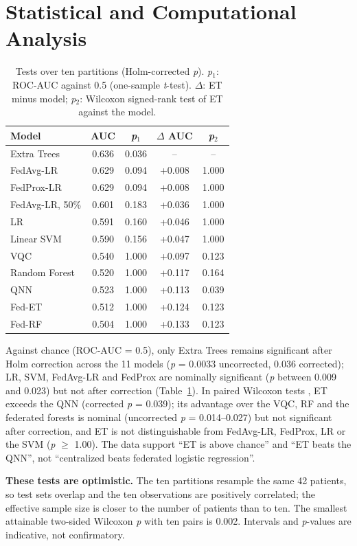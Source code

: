 \documentclass[conference,a4paper]{IEEEtran}
\begin{document}
\section{Statistical and Computational Analysis}
\begin{table}[!t]\centering\caption{Tests over ten partitions (Holm-corrected \textit{p}). \textit{p}$_1$: ROC-AUC against 0.5 (one-sample \textit{t}-test). $\Delta$: ET minus model; \textit{p}$_2$: Wilcoxon signed-rank test of ET against the model.}\label{tab:stats}\scriptsize\setlength{\tabcolsep}{2.5pt}
\begin{tabular}{lcccc}\toprule
Model & AUC & \textit{p}$_1$ & $\Delta$ AUC & \textit{p}$_2$\\\midrule
Extra Trees & 0.636 & 0.036 & -- & --\\
FedAvg-LR & 0.629 & 0.094 & +0.008 & 1.000\\
FedProx-LR & 0.629 & 0.094 & +0.008 & 1.000\\
FedAvg-LR, 50\% & 0.601 & 0.183 & +0.036 & 1.000\\
LR & 0.591 & 0.160 & +0.046 & 1.000\\
Linear SVM & 0.590 & 0.156 & +0.047 & 1.000\\
VQC & 0.540 & 1.000 & +0.097 & 0.123\\
Random Forest & 0.520 & 1.000 & +0.117 & 0.164\\
QNN & 0.523 & 1.000 & +0.113 & 0.039\\
Fed-ET & 0.512 & 1.000 & +0.124 & 0.123\\
Fed-RF & 0.504 & 1.000 & +0.133 & 0.123\\
\bottomrule\end{tabular}\end{table}
Against chance (ROC-AUC = 0.5), only Extra Trees remains significant after Holm correction \cite{holm1979} across the 11 models (\textit{p} = 0.0033 uncorrected, 0.036 corrected); LR, SVM, FedAvg-LR and FedProx are nominally significant (\textit{p} between 0.009 and 0.023) but not after correction (Table~\ref{tab:stats}). In paired Wilcoxon tests \cite{wilcoxon1945}, ET exceeds the QNN (corrected \textit{p} = 0.039); its advantage over the VQC, RF and the federated forests is nominal (uncorrected \textit{p} = 0.014--0.027) but not significant after correction, and ET is not distinguishable from FedAvg-LR, FedProx, LR or the SVM (\textit{p} $\geq$ 1.00). The data support ``ET is above chance'' and ``ET beats the QNN'', not ``centralized beats federated logistic regression''.

\textbf{These tests are optimistic.} The ten partitions resample the same 42 patients, so test sets overlap and the ten observations are positively correlated; the effective sample size is closer to the number of patients than to ten. The smallest attainable two-sided Wilcoxon \textit{p} with ten pairs is 0.002. Intervals and \textit{p}-values are indicative, not confirmatory.
\end{document}
